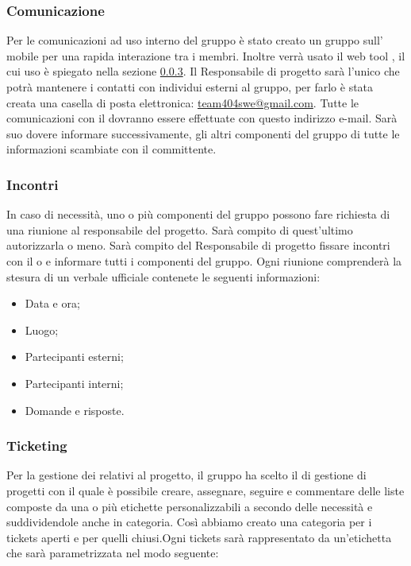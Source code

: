 \documentclass[a4paper,11pt]{article}
\begin{document}
		\subsubsection{Comunicazione}
			Per le comunicazioni ad uso interno del gruppo è stato creato un gruppo sull' mobile  per una rapida interazione tra i membri. Inoltre verrà usato il web tool , il cui uso è spiegato nella sezione \ref{subsec:ticketing}.
			Il Responsabile di progetto sarà l'unico che potrà mantenere i contatti con individui esterni al gruppo, per farlo è stata creata una casella di posta elettronica: \url{team404swe@gmail.com}. Tutte le comunicazioni con il  dovranno essere effettuate con questo indirizzo e-mail. Sarà suo dovere informare successivamente, gli altri componenti del gruppo di tutte le informazioni scambiate con il committente.
		\subsubsection{Incontri}
		In caso di necessità, uno o più componenti del gruppo possono fare richiesta di una riunione al responsabile del progetto. Sarà compito di quest'ultimo autorizzarla o meno. 
		Sarà compito del Responsabile di progetto fissare incontri con il o  e informare tutti i componenti del gruppo. Ogni riunione comprenderà la stesura di un verbale ufficiale contenete le seguenti informazioni:
\begin{itemize}
\item Data e ora;
\item Luogo;
\item Partecipanti esterni;
\item Partecipanti interni;
\item Domande e risposte.
\end{itemize}
		
		\subsubsection{Ticketing} 	\label{subsec:ticketing}
		Per la gestione dei  relativi al progetto, il gruppo ha scelto il  di gestione di progetti  con il quale è possibile creare, assegnare, seguire e commentare delle liste composte
da una o più etichette personalizzabili a secondo delle necessità e suddividendole anche in categoria. Così abbiamo creato una categoria  per i tickets aperti e  per quelli chiusi.Ogni tickets sarà rappresentato da un'etichetta che sarà parametrizzata nel modo seguente:
\end{document}
